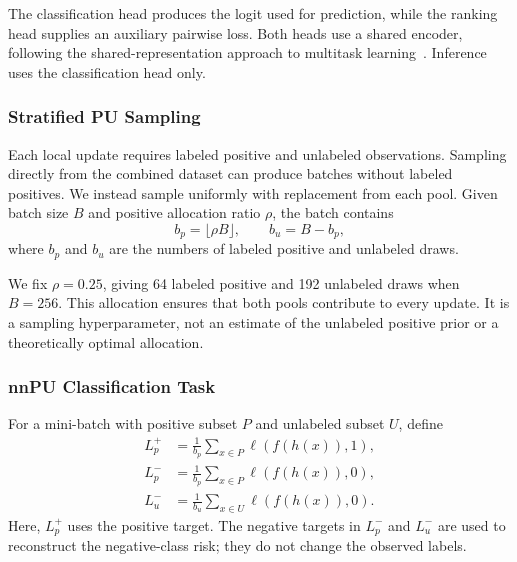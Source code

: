 \documentclass[lettersize,journal]{IEEEtran}
\begin{document}
The classification head produces the logit used for prediction, while the ranking head supplies an auxiliary pairwise loss. Both heads use a shared encoder, following the shared-representation approach to multitask learning~\cite{ref_multitask}. Inference uses the classification head only.

\subsubsection{Stratified PU Sampling}

Each local update requires labeled positive and unlabeled observations. Sampling directly from the combined dataset can produce batches without labeled positives. We instead sample uniformly with replacement from each pool. Given batch size $B$ and positive allocation ratio $\rho$, the batch contains
\begin{equation}
b_p=\lfloor\rho B\rfloor,\qquad b_u=B-b_p,
\label{eq:batch-allocation}
\end{equation}
where $b_p$ and $b_u$ are the numbers of labeled positive and unlabeled draws.

We fix $\rho=0.25$, giving 64 labeled positive and 192 unlabeled draws when $B=256$. This allocation ensures that both pools contribute to every update. It is a sampling hyperparameter, not an estimate of the unlabeled positive prior or a theoretically optimal allocation.

\subsubsection{nnPU Classification Task}

For a mini-batch with positive subset $P$ and unlabeled subset $U$, define
\begin{align}
L_p^+&=\frac{1}{b_p}\sum_{x\in P}\ell(f(h(x)),1),
\label{eq:positive-positive-loss}\\
L_p^-&=\frac{1}{b_p}\sum_{x\in P}\ell(f(h(x)),0),
\label{eq:positive-negative-loss}\\
L_u^-&=\frac{1}{b_u}\sum_{x\in U}\ell(f(h(x)),0).
\label{eq:unlabeled-negative-loss}
\end{align}
Here, $L_p^+$ uses the positive target. The negative targets in $L_p^-$ and $L_u^-$ are used to reconstruct the negative-class risk; they do not change the observed labels.
\end{document}
